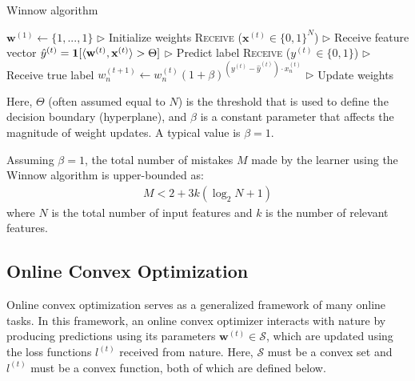 \documentclass[11pt]{article}
\begin{document}
\begin{algorithm}[H]
\caption{Winnow algorithm}
\label{algo:winnow}
\begin{algorithmic}[1]
\STATE $\textbf{w}^{(1)} \leftarrow \{1,...,1\}$ \hfill $\triangleright$ Initialize weights
\STATE \textsc{Receive} ($\textbf{x}^{(t)} \in\{0, 1\}^N$) \hfill $\triangleright$ Receive feature vector
\STATE $\hat{y}^{(t)} = \textbf{1}[\langle \textbf w^{(t)}, \textbf x^{(t)}\rangle>\Theta]$ \hfill $\triangleright$ Predict label
\STATE \textsc{Receive} ($y^{(t)}\in\{0, 1\}$) \hfill $\triangleright$ Receive true label
\STATE $w_n^{(t+1)}\leftarrow w_n^{(t)} (1+\beta)^{ (y^{(t)}-\hat{y}^{(t)})\cdot x_n^{(t)}} $ \hfill $\triangleright$ Update weights
\ENDFOR
\end{algorithmic}\label{algo:winnow}
\end{algorithm}
Here, $\Theta$ (often assumed equal to $N$) is the threshold that is used to define the decision boundary (hyperplane), and $\beta$ is a constant parameter that affects the magnitude of weight updates. A typical value is $\beta=1$. 

Assuming $\beta=1$, the total number of mistakes $M$ made by the learner using the Winnow algorithm is upper-bounded as:
\begin{align}
    M<2+3k({\log_2 N+1})
\end{align}
where $N$ is the total number of input features and $k$ is the number of relevant features.

\subsection{Online Convex Optimization}
Online convex optimization serves as a generalized framework of many online tasks. In this framework, an online convex optimizer interacts with nature by producing predictions using its parameters $\boldsymbol{w}^{(t)}\in \mathcal{S}$, which are updated using the loss functions ${l}^{(t)}$ received from nature. Here, $\mathcal{S}$ must be a convex set and ${l}^{(t)}$ must be a convex function, both of which are defined below. 
\end{document}
